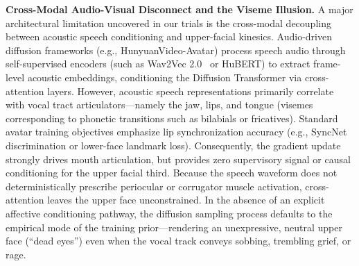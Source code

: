 \documentclass[pdflatex,sn-mathphys-num]{sn-jnl}
\theoremstyle{thmstyleone}
\theoremstyle{thmstyletwo}
\theoremstyle{thmstylethree}
\begin{document}
\textbf{Cross-Modal Audio-Visual Disconnect and the Viseme Illusion.} A major architectural limitation uncovered in our trials is the cross-modal decoupling between acoustic speech conditioning and upper-facial kinesics. Audio-driven diffusion frameworks (e.g., HunyuanVideo-Avatar) process speech audio through self-supervised encoders (such as Wav2Vec 2.0~\cite{baevski2020wav2vec} or HuBERT) to extract frame-level acoustic embeddings, conditioning the Diffusion Transformer via cross-attention layers. However, acoustic speech representations primarily correlate with vocal tract articulators---namely the jaw, lips, and tongue (visemes corresponding to phonetic transitions such as bilabials or fricatives). Standard avatar training objectives emphasize lip synchronization accuracy (e.g., SyncNet discrimination or lower-face landmark loss). Consequently, the gradient update strongly drives mouth articulation, but provides zero supervisory signal or causal conditioning for the upper facial third. Because the speech waveform does not deterministically prescribe periocular or corrugator muscle activation, cross-attention leaves the upper face unconstrained. In the absence of an explicit affective conditioning pathway, the diffusion sampling process defaults to the empirical mode of the training prior---rendering an unexpressive, neutral upper face (``dead eyes'') even when the vocal track conveys sobbing, trembling grief, or rage.
\end{document}

